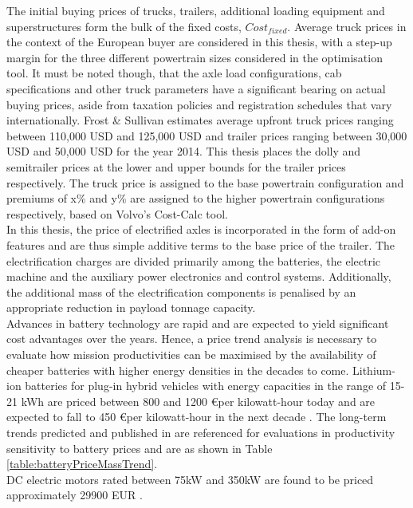 \documentclass[ExampleMasters.tex]{subfiles}
\begin{document}
	The initial buying prices of trucks, trailers, additional loading equipment and superstructures form the bulk of the fixed costs, $Cost_{fixed}$. Average truck prices in the context of the European buyer are considered in this thesis, with a step-up margin for the three different powertrain sizes considered in the optimisation tool. It must be noted though, that the axle load configurations, cab specifications and other truck parameters have a significant bearing on actual buying prices, aside from taxation policies and registration schedules that vary internationally. Frost \& Sullivan \cite{FrostSullivan} estimates average upfront truck prices ranging between 110,000 USD and 125,000 USD and trailer prices ranging between 30,000 USD and 50,000 USD for the year 2014. This thesis places the dolly and semitrailer prices at the lower and upper bounds for the trailer prices respectively. The truck price is assigned to the base powertrain configuration and premiums of x\% and y\% are assigned to the higher powertrain configurations respectively, based on Volvo's Cost-Calc tool.\\

	In this thesis, the price of electrified axles is incorporated in the form of add-on features and are thus simple additive terms to the base price of the trailer. The electrification charges are divided primarily among the batteries, the electric machine and the auxiliary power electronics and control systems. Additionally, the additional mass of the electrification components is penalised by an appropriate reduction in payload tonnage capacity.\\

	Advances in battery technology are rapid and are expected to yield significant cost advantages over the years. Hence, a price trend analysis is necessary to evaluate how mission productivities can be maximised by the availability of cheaper batteries with higher energy densities in the decades to come. Lithium-ion batteries for plug-in hybrid vehicles with energy capacities in the range of 15-21 kWh are priced between 800 and 1200 \euro per kilowatt-hour today \cite{EUROBAT} and are expected to fall to 450 \euro per kilowatt-hour in the next decade \cite{EUROBAT}. The long-term trends predicted and published in \cite[T.~8-16]{ElementEnergy} are referenced for evaluations in productivity sensitivity to battery prices and are as shown in Table \ref{table:batteryPriceMassTrend}.\\

	DC electric motors rated between 75kW and 350kW are found to be priced approximately 29900 EUR \cite{EuPLot30Motors}.
\end{document}
